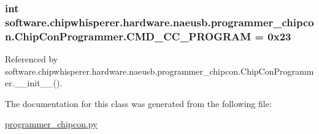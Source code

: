 \subsubsection[{C\+M\+D\+\_\+\+C\+C\+\_\+\+P\+R\+O\+G\+R\+A\+M}]{\setlength{\rightskip}{0pt plus 5cm}int software.\+chipwhisperer.\+hardware.\+naeusb.\+programmer\+\_\+chipcon.\+Chip\+Con\+Programmer.\+C\+M\+D\+\_\+\+C\+C\+\_\+\+P\+R\+O\+G\+R\+A\+M = 0x23\hspace{0.3cm}{\ttfamily [static]}}\label{classsoftware_1_1chipwhisperer_1_1hardware_1_1naeusb_1_1programmer__chipcon_1_1ChipConProgrammer_a9819c7d7318f3ab4a2d10ac5c1298b1e}


Referenced by software.\+chipwhisperer.\+hardware.\+naeusb.\+programmer\+\_\+chipcon.\+Chip\+Con\+Programmer.\+\_\+\+\_\+init\+\_\+\+\_\+().



The documentation for this class was generated from the following file\+:\begin{DoxyCompactItemize}
\item 
\hyperlink{programmer__chipcon_8py}{programmer\+\_\+chipcon.\+py}\end{DoxyCompactItemize}

